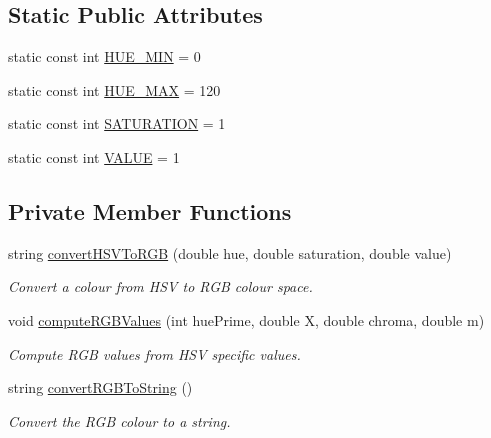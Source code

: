 \subsection*{Static Public Attributes}
\begin{DoxyCompactItemize}
\item 
static const int \hyperlink{classmultiscale_1_1RGBColourGenerator_ae31c47c9fccf50b3688728126040bc23}{H\-U\-E\-\_\-\-M\-I\-N} = 0
\item 
static const int \hyperlink{classmultiscale_1_1RGBColourGenerator_a282d986019f3c02b46c122badf806cd0}{H\-U\-E\-\_\-\-M\-A\-X} = 120
\item 
static const int \hyperlink{classmultiscale_1_1RGBColourGenerator_a9442495dac9306e4172a27cba12788cc}{S\-A\-T\-U\-R\-A\-T\-I\-O\-N} = 1
\item 
static const int \hyperlink{classmultiscale_1_1RGBColourGenerator_a859abef56e015354d032c46680132850}{V\-A\-L\-U\-E} = 1
\end{DoxyCompactItemize}
\subsection*{Private Member Functions}
\begin{DoxyCompactItemize}
\item 
string \hyperlink{classmultiscale_1_1RGBColourGenerator_af29401043271ed11f69cdd0ecf52649e}{convert\-H\-S\-V\-To\-R\-G\-B} (double hue, double saturation, double value)
\begin{DoxyCompactList}\small\item\em Convert a colour from H\-S\-V to R\-G\-B colour space. \end{DoxyCompactList}\item 
void \hyperlink{classmultiscale_1_1RGBColourGenerator_a3c72c2ef3fa50215e73732e324f6f1e1}{compute\-R\-G\-B\-Values} (int hue\-Prime, double X, double chroma, double m)
\begin{DoxyCompactList}\small\item\em Compute R\-G\-B values from H\-S\-V specific values. \end{DoxyCompactList}\item 
string \hyperlink{classmultiscale_1_1RGBColourGenerator_ab5600e0c10534f0d80511178c43ec507}{convert\-R\-G\-B\-To\-String} ()
\begin{DoxyCompactList}\small\item\em Convert the R\-G\-B colour to a string. \end{DoxyCompactList}\end{DoxyCompactItemize}
